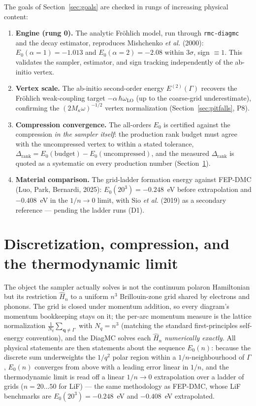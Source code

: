 \documentclass[11pt]{article}
\newcommand{\qv}{\mathbf{q}}
\begin{document}
The goals of Section~\ref{sec:goals} are checked in rungs of increasing physical content:
\begin{enumerate}
  \item \textbf{Engine (rung 0).} The analytic Fr\"ohlich model, run through
    \texttt{rmc-diagmc} and the decay estimator, reproduces Mishchenko \emph{et al.} (2000):
    $E_{0}(\alpha{=}1)=-1.013$ and $E_{0}(\alpha{=}2)=-2.08$ within $3\sigma$, sign
    $\equiv1$. This validates the sampler, estimator, and sign tracking independently of the
    ab-initio vertex.
  \item \textbf{Vertex scale.} The ab-initio second-order energy $E^{(2)}(\Gamma)$ recovers
    the Fr\"ohlich weak-coupling target $-\alpha\,\hbar\omega_{\mathrm{LO}}$ (up to the
    coarse-grid underestimate), confirming the $(2M_{\kappa}\omega)^{-1/2}$ vertex
    normalization (Section~\ref{sec:pitfalls}, P8).
  \item \textbf{Compression convergence.} The all-orders $E_{0}$ is certified against the
    compression \emph{in the sampler itself}: the production rank budget must agree with the
    uncompressed vertex to within a stated tolerance,
    $\Delta_{\mathrm{rank}}=E_{0}(\text{budget})-E_{0}(\text{uncompressed})$, and the measured
    $\Delta_{\mathrm{rank}}$ is quoted as a systematic on every production number
    (Section~\ref{sec:discretization}).
  \item \textbf{Material comparison.} The grid-ladder formation energy against FEP-DMC
    (Luo, Park, Bernardi, 2025): $E_{0}(20^{3})=-0.248$~eV before extrapolation and
    $-0.408$~eV in the $1/n\to0$ limit, with Sio \emph{et al.} (2019) as a secondary
    reference --- pending the ladder runs (D1).
\end{enumerate}

\section{Discretization, compression, and the thermodynamic limit}
\label{sec:discretization}

The object the sampler actually solves is not the continuum polaron Hamiltonian but its
restriction $\hat H_{n}$ to a uniform $n^{3}$ Brillouin-zone grid shared by electrons and
phonons. The grid is closed under momentum addition, so every diagram's momentum
bookkeeping stays on it; the per-arc momentum measure is the lattice normalization
$\frac{1}{N_{q}}\sum_{\qv\neq\Gamma}$ with $N_{q}=n^{3}$ (matching the standard
first-principles self-energy convention), and the DiagMC solves each $\hat H_{n}$
\emph{numerically exactly}. All physical statements are then statements about the sequence
$E_{0}(n)$: because the discrete sum underweights the $1/q^{2}$ polar region within a
$1/n$-neighbourhood of $\Gamma$, $E_{0}(n)$ converges from above with a leading error
linear in $1/n$, and the thermodynamic limit is read off a linear $1/n\to0$ extrapolation
over a ladder of grids ($n=20\ldots50$ for LiF) --- the same methodology as FEP-DMC, whose
LiF benchmarks are $E_{0}(20^{3})=-0.248$~eV and $-0.408$~eV extrapolated.
\end{document}
